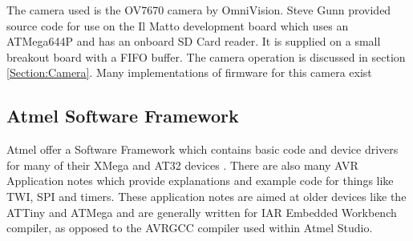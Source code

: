 The camera used is the OV7670 camera by OmniVision. Steve Gunn provided source code for use on the Il Matto development board which uses an ATMega644P and has an onboard SD Card reader. It is supplied on a small breakout board with a FIFO buffer. The camera operation is discussed in section \ref{Section:Camera}. Many implementations of firmware for this camera exist

\subsection{Atmel Software Framework}

Atmel offer a Software Framework which contains basic code and device drivers for many of their XMega and AT32 devices \cite{Atmel:ASF}. There are also many AVR Application notes which provide explanations and example code for things like TWI, SPI and timers. These application notes are aimed at older devices like the ATTiny and ATMega and are generally written for IAR Embedded Workbench compiler, as opposed to the AVRGCC compiler used within Atmel Studio. 

%
%
%
%
%


